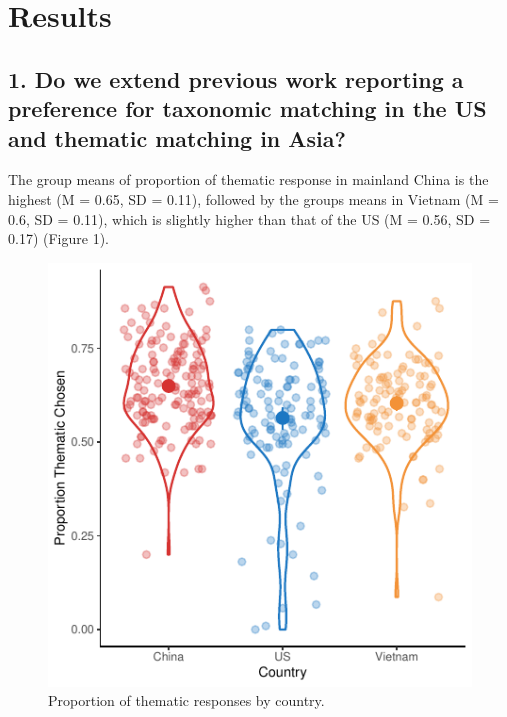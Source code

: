 \documentclass[10pt, letterpaper]{article}
\newenvironment{CodeChunk}{}{}
\begin{document}
\hypertarget{results}{%
\section{Results}\label{results}}

\hypertarget{do-we-extend-previous-work-reporting-a-preference-for-taxonomic-matching-in-the-us-and-thematic-matching-in-asia}{%
\subsection{1. Do we extend previous work reporting a preference for
taxonomic matching in the US and thematic matching in
Asia?}\label{do-we-extend-previous-work-reporting-a-preference-for-taxonomic-matching-in-the-us-and-thematic-matching-in-asia}}

The group means of proportion of thematic response in mainland China is
the highest (M = 0.65, SD = 0.11), followed by the groups means in
Vietnam (M = 0.6, SD = 0.11), which is slightly higher than that of the
US (M = 0.56, SD = 0.17) (Figure 1).

\begin{CodeChunk}
\begin{figure}[tb]

{\centering \includegraphics{figs/unnamed-chunk-1-1} 

}

\caption[Proportion of thematic responses by country]{Proportion of thematic responses by country.}\label{fig:unnamed-chunk-1}
\end{figure}
\end{CodeChunk}
\end{document}
